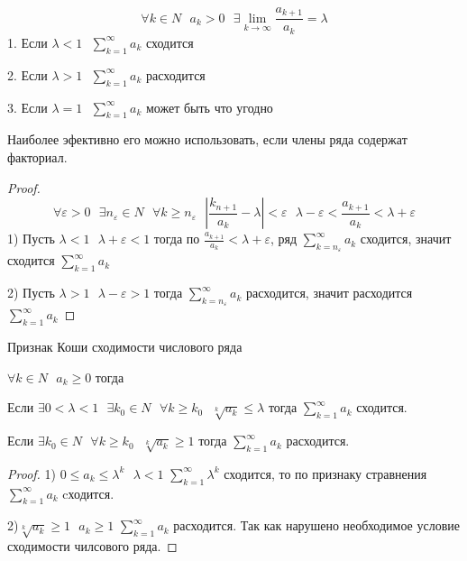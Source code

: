 \begin{block}
  $$
  \forall k \in N ~~~ a_k > 0 ~~~
  \exists \lim_{k \to \infty} \frac{a_{k+1}}{a_k} = \lambda
  $$
  1. Если $\lambda < 1 ~~~ \sum_{k=1}^{\infty} a_k$ сходится

  2. Если $\lambda > 1 ~~~ \sum_{k=1}^{\infty} a_k$ расходится

  3. Если $\lambda = 1 ~~~ \sum_{k=1}^{\infty} a_k$ может быть что угодно

  Наиболее эфективно его можно использовать, если члены ряда содержат факториал.
\end{block}

\begin{proof}
  $$
  \forall \varepsilon > 0 ~~~
  \exists n_{\varepsilon} \in N ~~~
  \forall k \ge n_{\varepsilon} ~~~
  \left| \frac{k_{n+1}}{a_k} - \lambda \right| < \varepsilon ~~~
  \lambda - \varepsilon < \frac{a_{k+1}}{a_k} < \lambda + \varepsilon
  $$
  1) Пусть $\lambda < 1 ~~~ \lambda + \varepsilon < 1$ тогда по
  $\frac{a_{k+1}}{a_k} < \lambda + \varepsilon$, ряд
  $\sum_{k = n_{\varepsilon}}^{\infty} a_k$ сходится, значит сходится
  $\sum_{k = 1}^{\infty} a_k$

  2) Пусть $\lambda > 1 ~~~ \lambda - \varepsilon > 1$ тогда
  $\sum_{k = n_{\varepsilon}}^{\infty} a_k$ расходится, значит расходится
  $\sum_{k = 1}^{\infty} a_k$
\end{proof}

\begin{title}[\Large]
  Признак Коши сходимости числового ряда
\end{title}

\begin{block}
  $\forall k \in N ~~~ a_k \ge 0 $ тогда

  Если $\exists 0 < \lambda < 1 ~~~ \exists k_0 \in N ~~~ \forall k \ge k_0 ~~~
  \sqrt[k]{a_k} \le \lambda$ тогда $\sum_{k=1}^{\infty} a_k$ сходится.

  Если $\exists k_0 \in N ~~~ \forall k \ge k_0 ~~~ \sqrt[k]{a_k} \ge 1$ тогда
  $\sum_{k=1}^{\infty} a_k$ расходится.
\end{block}

\begin{proof}
  1) $0 \le a_k \le \lambda^k ~~~ \lambda < 1$ $\sum_{k=1}^{\infty} \lambda^k$
  сходится, то по признаку стравнения $\sum_{k=1}^{\infty} a_k$ cходится.

  2)$\sqrt[k]{a_k} \ge 1 ~~~ a_k \ge 1$ $\sum_{k=1}^{\infty} a_k$ расходится.
  Так как нарушено необходимое условие сходимости чилсового ряда.
\end{proof}

